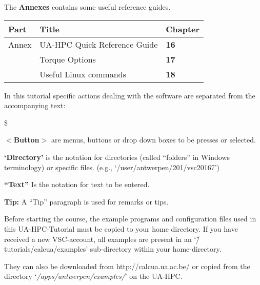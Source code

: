 The \textbf{Annexes }contains some useful reference guides.

\begin{tabular}{|p{0.3in}|p{2.0in}|p{0.5in}|} \hline
\textbf{Part} & \textbf{Title} & \textbf{Chapter} \\ \hline
Annex & UA-HPC Quick Reference Guide & \textbf{16} \\ \hline
& Torque Options & \textbf{17} \\ \hline
& Useful Linux commands & \textbf{18} \\ \hline
\end{tabular}

\textbf{}

In this tutorial specific actions dealing with the software are separated from the accompanying text:

\$ %

\textbf{$<$Button$>$} are menus, buttons or drop down boxes to be presses or selected.

\textbf{`Directory'} is the notation for directories (called ``folders'' in Windows terminology) or specific files. (e.g., `/user/antwerpen/201/vsc20167')

\textbf{``Text''} Is the notation for text to be entered.

\textbf{Tip: }A ``Tip'' paragraph is used for remarks or tips.

\textbf{}

Before starting the course, the example programs and configuration files used in this UA-HPC-Tutorial must be copied to your home directory. If you have received a new VSC-account, all examples are present in an `\~/tutorials/calcua/examples' sub-directory within your home-directory.



They can also be downloaded from http://calcua.ua.ac.be/ or copied from the directory  `\textit{/apps/antwerpen/examples/}' on the UA-HPC.

\begin{prompt}
$ %
$ %
\end{prompt}

